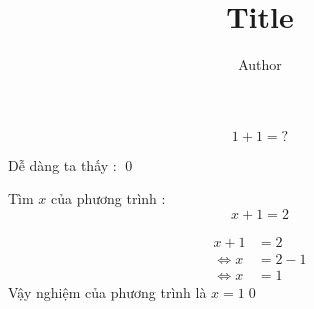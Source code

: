 \documentclass{article}
\title{Title}
\author{Author}
\date{}
\begin{document}
\onehalfspacing %

\begin{question}{1}
    \[1 + 1 = ?\]
\end{question}

\begin{solution}
    Dễ dàng ta thấy :  \qed
\end{solution}


\begin{question}{2}
    Tìm $x$ của phương trình : \[x + 1 = 2\]
\end{question}

\begin{solution}
    \begin{alignat*}{2}
        x + 1 &= 2 \\
        \Leftrightarrow x &= 2 - 1 \\
        \Leftrightarrow x &= 1
    \end{alignat*}
    Vậy nghiệm của phương trình là $x = 1$\qed  
\end{solution}
\end{document}
